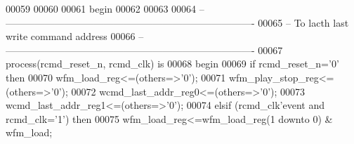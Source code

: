 \begin{DoxyCode}
00059 
00060   
00061 \textcolor{vhdlkeyword}{begin}
00062 
00063 
00064 \textcolor{keyword}{-- ----------------------------------------------------------------------------}
00065 \textcolor{keyword}{-- To lacth last write command address}
00066 \textcolor{keyword}{-- ----------------------------------------------------------------------------}
00067 \textcolor{keywordflow}{process}(rcmd_reset_n, rcmd_clk) \textcolor{keywordflow}{is} 
00068 \textcolor{vhdlkeyword}{    begin }
00069         \textcolor{keywordflow}{if} \textcolor{vhdlchar}{rcmd_reset_n}\textcolor{vhdlchar}{=}\textcolor{vhdlchar}{'}\textcolor{vhdllogic}{}\textcolor{vhdllogic}{0}\textcolor{vhdlchar}{'} \textcolor{keywordflow}{then} 
00070             \textcolor{vhdlchar}{wfm_load_reg}\textcolor{vhdlchar}{<=}\textcolor{vhdlchar}{(}\textcolor{keywordflow}{others}\textcolor{vhdlchar}{=}\textcolor{vhdlchar}{>}\textcolor{vhdlchar}{'}\textcolor{vhdllogic}{}\textcolor{vhdllogic}{0}\textcolor{vhdlchar}{'}\textcolor{vhdlchar}{)};
00071             \textcolor{vhdlchar}{wfm_play_stop_reg}\textcolor{vhdlchar}{<=}\textcolor{vhdlchar}{(}\textcolor{keywordflow}{others}\textcolor{vhdlchar}{=}\textcolor{vhdlchar}{>}\textcolor{vhdlchar}{'}\textcolor{vhdllogic}{}\textcolor{vhdllogic}{0}\textcolor{vhdlchar}{'}\textcolor{vhdlchar}{)};
00072             \textcolor{vhdlchar}{wcmd_last_addr_reg0}\textcolor{vhdlchar}{<=}\textcolor{vhdlchar}{(}\textcolor{keywordflow}{others}\textcolor{vhdlchar}{=}\textcolor{vhdlchar}{>}\textcolor{vhdlchar}{'}\textcolor{vhdllogic}{}\textcolor{vhdllogic}{0}\textcolor{vhdlchar}{'}\textcolor{vhdlchar}{)};
00073             \textcolor{vhdlchar}{wcmd_last_addr_reg1}\textcolor{vhdlchar}{<=}\textcolor{vhdlchar}{(}\textcolor{keywordflow}{others}\textcolor{vhdlchar}{=}\textcolor{vhdlchar}{>}\textcolor{vhdlchar}{'}\textcolor{vhdllogic}{}\textcolor{vhdllogic}{0}\textcolor{vhdlchar}{'}\textcolor{vhdlchar}{)};
00074         \textcolor{keywordflow}{elsif} \textcolor{vhdlchar}{(}\textcolor{vhdlchar}{rcmd_clk}\textcolor{vhdlchar}{'}\textcolor{vhdlkeyword}{event} \textcolor{keywordflow}{and} \textcolor{vhdlchar}{rcmd_clk}\textcolor{vhdlchar}{=}\textcolor{vhdlchar}{'}\textcolor{vhdllogic}{}\textcolor{vhdllogic}{1}\textcolor{vhdlchar}{'}\textcolor{vhdlchar}{)} \textcolor{keywordflow}{then}
00075             \textcolor{vhdlchar}{wfm_load_reg}\textcolor{vhdlchar}{<=}\textcolor{vhdlchar}{wfm_load_reg}\textcolor{vhdlchar}{(}\textcolor{vhdllogic}{}\textcolor{vhdllogic}{1} \textcolor{keywordflow}{downto} \textcolor{vhdllogic}{}\textcolor{vhdllogic}{0}\textcolor{vhdlchar}{)} \textcolor{vhdlchar}{&} \textcolor{vhdlchar}{wfm_load};

\end{DoxyCode}
